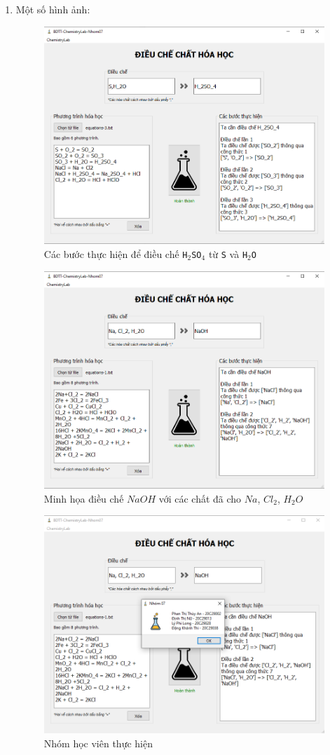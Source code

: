 \documentclass[a4paper]{article}
\begin{document}
\begin{enumerate}
		\item Một số hình ảnh:
		\begin{figure}[h]
			\centering
			\includegraphics[width=0.7\linewidth]{images/app-done-2}
			\caption{Các bước thực hiện để điều chế \texttt{H$_2$SO$_4$} từ \texttt{S} và \texttt{H$_2$O}}
			\label{fig:app-done-2}
		\end{figure}
		
		\begin{figure}
			\centering
			\includegraphics[width=0.7\linewidth]{images/app-done}
			\caption{Minh họa điều chế $NaOH$ với các chất đã cho $Na$, $Cl_2$, $H_2O$}
			\label{fig:app-done}
		\end{figure}
		
		\begin{figure}[h]
			\centering
			\includegraphics[width=0.7\linewidth]{images/app-authors}
			\caption{Nhóm học viên thực hiện}
			\label{fig:app-authors}
		\end{figure}
	\end{enumerate}
\end{document}
